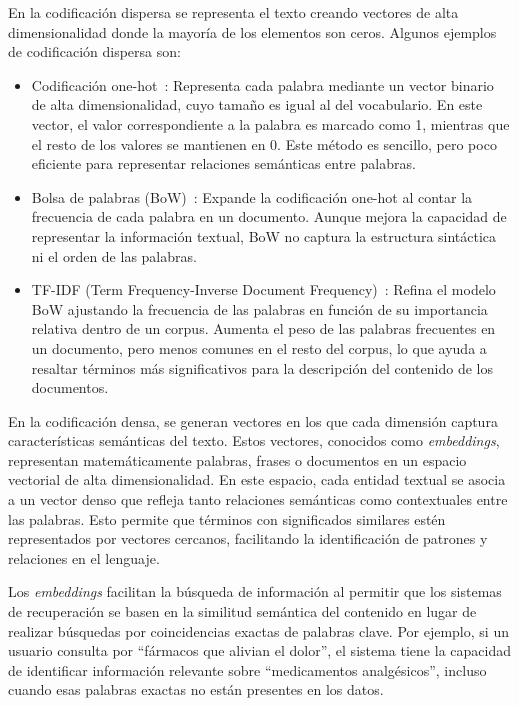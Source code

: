 En la codificación dispersa se representa el texto creando vectores de alta dimensionalidad donde la mayoría de los elementos son ceros. Algunos ejemplos de codificación dispersa son:
\begin{itemize} 
    \item Codificación one-hot~\cite{harris2010digital}: Representa cada palabra mediante un vector binario de alta dimensionalidad, cuyo tamaño es igual al del vocabulario. En este vector, el valor correspondiente a la palabra es marcado como 1, mientras que el resto de los valores se mantienen en 0. Este método es sencillo, pero poco eficiente para representar relaciones semánticas entre palabras.
    \item Bolsa de palabras (BoW)~\cite{harris1954distributional}: Expande la codificación one-hot al contar la frecuencia de cada palabra en un documento. Aunque mejora la capacidad de representar la información textual, BoW no captura la estructura sintáctica ni el orden de las palabras. 
    \item TF-IDF (Term Frequency-Inverse Document Frequency)~\cite{rajaraman2011data}: Refina el modelo BoW ajustando la frecuencia de las palabras en función de su importancia relativa dentro de un corpus. Aumenta el peso de las palabras frecuentes en un documento, pero menos comunes en el resto del corpus, lo que ayuda a resaltar términos más significativos para la descripción del contenido de los documentos. 
\end{itemize}

En la codificación densa, se generan vectores en los que cada dimensión captura características semánticas del texto. Estos vectores, conocidos como \textit{embeddings}, representan matemáticamente palabras, frases o documentos en un espacio vectorial de alta dimensionalidad. En este espacio, cada entidad textual se asocia a un vector denso que refleja tanto relaciones semánticas como contextuales entre las palabras. Esto permite que términos con significados similares estén representados por vectores cercanos, facilitando la identificación de patrones y relaciones en el lenguaje.

Los \textit{embeddings} facilitan la búsqueda de información al permitir que los sistemas de recuperación se basen en la similitud semántica del contenido en lugar de realizar búsquedas por coincidencias exactas de palabras clave. Por ejemplo, si un usuario consulta por ``fármacos que alivian el dolor'', el sistema tiene la capacidad de identificar información relevante sobre ``medicamentos analgésicos'', incluso cuando esas palabras exactas no están presentes en los datos.

